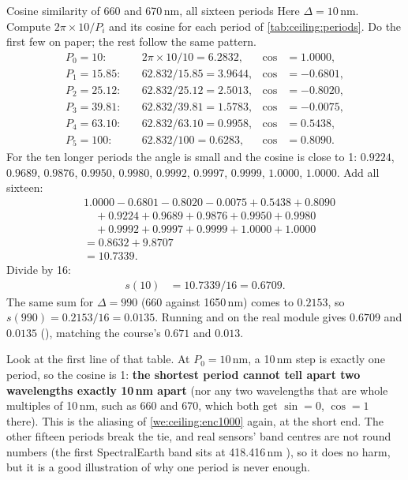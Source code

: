 \begin{worked}[label={we:ceiling:cossim}]{Cosine similarity of 660 and 670\,nm, all sixteen periods}
Here $\Delta = 10$\,nm. Compute $2\pi\times10/P_i$ and its cosine for each period of \cref{tab:ceiling:periods}. Do the first few on paper; the rest follow the same pattern.
\begin{align*}
  P_0 = 10:&\quad 2\pi\times10/10 = 6.2832, & \cos &= 1.0000,\\
  P_1 = 15.85:&\quad 62.832/15.85 = 3.9644, & \cos &= -0.6801,\\
  P_2 = 25.12:&\quad 62.832/25.12 = 2.5013, & \cos &= -0.8020,\\
  P_3 = 39.81:&\quad 62.832/39.81 = 1.5783, & \cos &= -0.0075,\\
  P_4 = 63.10:&\quad 62.832/63.10 = 0.9958, & \cos &= 0.5438,\\
  P_5 = 100:&\quad 62.832/100 = 0.6283, & \cos &= 0.8090.
\end{align*}
For the ten longer periods the angle is small and the cosine is close to 1: $0.9224$, $0.9689$, $0.9876$, $0.9950$, $0.9980$, $0.9992$, $0.9997$, $0.9999$, $1.0000$, $1.0000$. Add all sixteen:
\begin{align*}
  &1.0000 - 0.6801 - 0.8020 - 0.0075 + 0.5438 + 0.8090\\
  &\quad + 0.9224 + 0.9689 + 0.9876 + 0.9950 + 0.9980\\
  &\quad + 0.9992 + 0.9997 + 0.9999 + 1.0000 + 1.0000\\
  &= 0.8632 + 9.8707\\
  &= 10.7339 .
\end{align*}
Divide by 16:
\begin{align*}
  s(10) &= 10.7339/16 = 0.6709 .
\end{align*}
The same sum for $\Delta = 990$ (660 against 1650\,nm) comes to $0.2153$, so $s(990) = 0.2153/16 = 0.0135$. Running  and  on the real module gives $0.6709$ and $0.0135$\tagC{} (), matching the course's $0.671$ and $0.013$.
\end{worked}

Look at the first line of that table. At $P_0 = 10$\,nm, a 10\,nm step is exactly one period, so the cosine is 1: \textbf{the shortest period cannot tell apart two wavelengths exactly 10\,nm apart} (nor any two wavelengths that are whole multiples of 10\,nm, such as 660 and 670, which both get $\sin = 0$, $\cos = 1$ there). This is the aliasing of \cref{we:ceiling:enc1000} again, at the short end. The other fifteen periods break the tie, and real sensors' band centres are not round numbers (the first SpectralEarth band sits at 418.416\,nm ), so it does no harm, but it is a good illustration of why one period is never enough.

